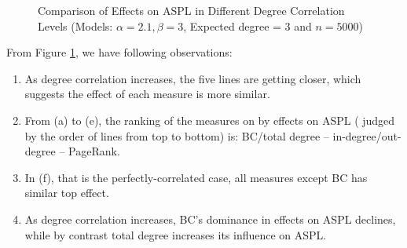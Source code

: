 \documentclass{article}
\begin{document}
\begin{enumerate}
\begin{figure}[!hbtp]
\hfill
{}
\hfill
{}
\hfill
\caption{
\label{comps}%
Comparison of Effects on ASPL in Different Degree Correlation Levels (Models: $\alpha=2.1, \beta=3$, Expected degree = 3 and $n=5000$)}
\end{figure}

From Figure \ref{comps}, we have following observations:
\begin{enumerate}
\item As degree correlation increases, the five lines are getting closer, which suggests the effect of each measure is more similar.
\item From (a) to (e), the ranking of the measures on by effects on ASPL ( judged by the order of lines from top to bottom) is: BC/total degree -- in-degree/out-degree -- PageRank.
\item In (f), that is the perfectly-correlated case, all measures except BC has similar top effect.
\item As degree correlation increases, BC's dominance in effects on ASPL declines, while by contrast total degree increases its influence on ASPL.
\end{enumerate}

\end{enumerate}
\end{document}
